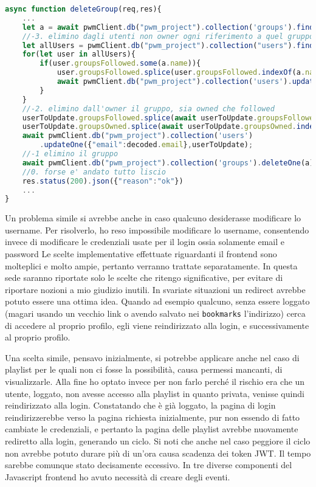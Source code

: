 \begin{lstlisting}[language=JavaScript]
async function deleteGroup(req,res){
    ...
    let a = await pwmClient.db("pwm_project").collection('groups').findOne({"name": validator.escape(req.params.name)})
    //-3. elimino dagli utenti non owner ogni riferimento a quel gruppo
    let allUsers = pwmClient.db("pwm_project").collection("users").find({"email":{$not: decoded.email}})
    for(let user in allUsers){
        if(user.groupsFollowed.some(a.name)){
            user.groupsFollowed.splice(user.groupsFollowed.indexOf(a.name),1)
            await pwmClient.db("pwm_project").collection('users').updateOne({"email":user.email},user)
        }
    }
    //-2. elimino dall'owner il gruppo, sia owned che followed
    userToUpdate.groupsFollowed.splice(await userToUpdate.groupsFollowed.indexOf(a.name),1)
    userToUpdate.groupsOwned.splice(await userToUpdate.groupsOwned.indexOf(a.name),1)
    await pwmClient.db("pwm_project").collection('users')
        .updateOne({"email":decoded.email},userToUpdate);
    //-1 elimino il gruppo
    await pwmClient.db("pwm_project").collection('groups').deleteOne(a)
    //0. forse e' andato tutto liscio
    res.status(200).json({"reason":"ok"})
    ...
}
\end{lstlisting}
\alert{Un problema simile si avrebbe anche in caso qualcuno desiderasse modificare lo username. Per risolverlo, ho reso impossibile modificare lo username, consentendo invece di modificare le credenziali usate per il login ossia solamente email e password}
Le scelte implementative effettuate riguardanti il frontend sono molteplici e molto ampie, pertanto verranno trattate separatamente. In questa sede saranno riportate solo le scelte che ritengo significative, per evitare di riportare nozioni a mio giudizio inutili.
In svariate situazioni un redirect avrebbe potuto essere una ottima idea. Quando ad esempio qualcuno, senza essere loggato (magari usando un vecchio link o avendo salvato nei \verb|bookmarks| l'indirizzo) cerca di accedere al proprio profilo, egli viene reindirizzato alla login, e successivamente al proprio profilo.

Una scelta simile, pensavo inizialmente, si potrebbe applicare anche nel caso di playlist per le quali non ci fosse la possibilità, causa permessi mancanti, di visualizzarle. Alla fine ho optato invece per non farlo perché il rischio era che un utente, loggato, non avesse accesso alla playlist in quanto privata, venisse quindi reindirizzato alla login. Constatando che è già loggato, la pagina di login reindirizzerebbe verso la pagina richiesta inizialmente, pur non essendo di fatto cambiate le credenziali, e pertanto la pagina delle playlist avrebbe nuovamente rediretto alla login, generando un ciclo.
\alert{Si noti che anche nel caso peggiore il ciclo non avrebbe potuto durare più di un'ora causa scadenza dei token JWT. Il tempo sarebbe comunque stato decisamente eccessivo.}
In tre diverse componenti del Javascript frontend ho avuto necessità di creare degli eventi.
